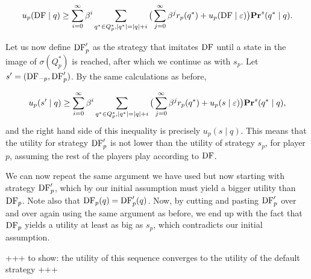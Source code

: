$$u_p( \text{\rm DF} \mid q) \geq \sum_{i=0}^\infty \beta^i \sum_{q^* \in Q^*_p, |q^*| = |q| + i} \big(\sum_{j = 0}^\infty \beta^j r_p(q^*) + u_p(\text{\rm DF} \mid \varepsilon)\big)  \mathbf{Pr}^s(q^* \mid q).$$

Let us now define $\text{\rm DF}'_p$ as the strategy that imitates $\text{\rm DF}$ until a state in the image of $\sigma(Q^*_p)$ is reached, after which 
we continue as with $s_p$. Let $s' = (\text{\rm DF}_{-p},\text{\rm DF}'_p)$. By the same calculations as before, 

$$u_p(s' \mid q) \geq \sum_{i=0}^\infty \beta^i \sum_{q^* \in Q^*_p, |q^*| = |q| + i} \big(\sum_{j = 0}^\infty \beta^j r_p(q^*) + u_p(s \mid \varepsilon)\big)  \mathbf{Pr}^s(q^* \mid q), $$
and the right hand side of this inequality is precisely $u_p(s \mid q)$. This means that the utility for strategy $\text{\rm DF}'_p$ is not lower than the utility of strategy $s_p$, for player $p$, assuming the rest of the players play according to $\text{\rm DF}$. 

We can now repeat the same argument we have used but now starting with strategy $\text{\rm DF}'_p$, which by our initial assumption must yield 
a bigger utility than $\text{\rm DF}_p$. Note also that $\text{\rm DF}_p(q) = \text{\rm DF}_p'(q)$. 
Now, by cutting and pasting $\text{\rm DF}'_p$ over and over again using the same argument as before, we end up with the fact that $\text{\rm DF}_p$ yields 
a utility at least as big as $s_p$, which contradicts our initial assumption. 

+++ to show: the utility of this sequence converges to the utility of the default strategy +++








